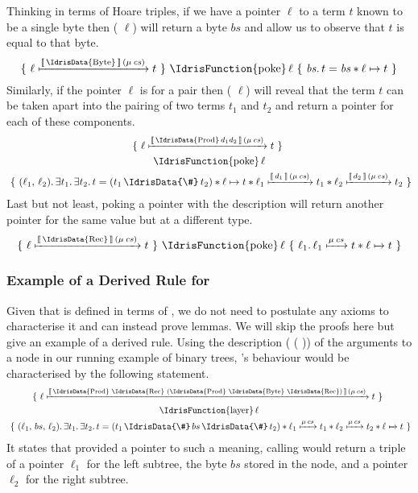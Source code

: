 Thinking in terms of Hoare triples, if we have a pointer
$\ell$ to a term $t$ known to be a single byte then
( $\ell$)
will return a byte $bs$ and allow us to observe that $t$ is
equal to that byte.
\[
\Hoare
    {\Pointer{\ell}{\Meaning{\text{\IdrisData{Byte}}}{cs}}{t}}
    {\text{\IdrisFunction{poke}}\,\ell}
    {\mathit{bs}}
    {t = \mathit{bs} \ast \ell \mapsto t}
\]
Similarly, if the pointer $\ell$ is for a pair then
( $\ell$) will
reveal that the term $t$ can be taken apart into the pairing
of two terms $t_1$ and $t_2$ and
return a pointer for each of these components.
\begin{gather*}
\Hoare
    {\Pointer{\ell}{\Meaning{\text{\IdrisData{Prod}}\, d_1 d_2}{cs}}{t}}
    {\\\text{\IdrisFunction{poke}}\,\ell\\}
    {(\ell_1,\, \ell_2)}
    {\exists t_1.\, \exists t_2.\, t = (t_1 \,\text{\IdrisData{\#}}\, t_2)
        \ast \ell \mapsto t \ast \Pointer{\ell_1}{\Meaning{d_1}{cs}}{t_1} \ast \Pointer{\ell_2}{\Meaning{d_2}{cs}}{t_2}}
\end{gather*}
Last but not least, poking a pointer with the 
description will return another pointer for the same value but
at a different type.
\[
\Hoare
    {\Pointer{\ell}{\Meaning{\text{\IdrisData{Rec}}}{cs}}{t}}
    {\text{\IdrisFunction{poke}}\,\ell}
    {\ell_1}
    {\Pointer{\ell_1}{\Mu{cs}}{t} \ast \Pointer{\ell}{}{t}}
\]

\subsubsection{Example of a Derived Rule for }

Given that  is defined in terms of ,
we do not need to postulate any axioms to characterise it and can instead
prove lemmas.
%
We will skip the proofs here but give an example of a derived rule.
%
Using the description (  (  ))
of the arguments to a node in our running example of binary trees,
's behaviour would be characterised by the following
statement.
\begin{gather*}
\Hoare
    {\Pointer{\ell}{\Meaning{\text{\IdrisData{Prod} \IdrisData{Rec} (\IdrisData{Prod} \IdrisData{Byte} \IdrisData{Rec})}}{cs}}{t}}
    {\\\text{\IdrisFunction{layer}}\,\ell\\}
    {(\ell_1,\, bs,\, \ell_2)}
    {\exists t_1.\, \exists t_2.\,
      t = (t_1 \,\text{\IdrisData{\#}}\, bs \,\text{\IdrisData{\#}}\, t_2)
      \ast \Pointer{\ell_1}{\Mu{cs}}{t_1}
      \ast \Pointer{\ell_2}{\Mu{cs}}{t_2}
      \ast \Pointer{\ell}{}{t}}
\end{gather*}
It states that provided a pointer to such a meaning,
calling  would
return a triple of
a pointer $\ell_1$ for the left subtree,
the byte $\mathit{bs}$ stored in the node,
and a pointer $\ell_2$ for the right subtree.

